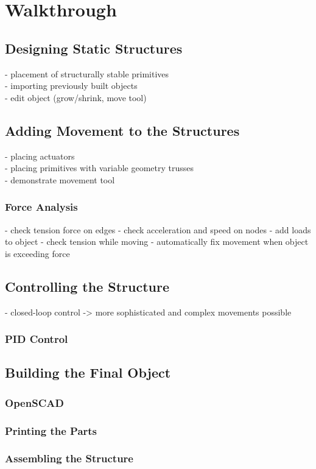 \chapter{Walkthrough}\label{ch:walkthrough}
\section{Designing Static Structures}
- placement of structurally stable primitives\\
- importing previously built objects\\
- edit object (grow/shrink, move tool)
\section{Adding Movement to the Structures}
- placing actuators\\
- placing primitives with variable geometry trusses\\
- demonstrate movement tool\\
\subsection{Force Analysis}
- check tension force on edges
- check acceleration and speed on nodes
- add loads to object
- check tension while moving
- automatically fix movement when object is exceeding force
\section{Controlling the Structure}
- closed-loop control -> more sophisticated and complex movements possible
\subsection{PID Control}
\section{Building the Final Object}
\subsection{OpenSCAD}
\subsection{Printing the Parts}
\subsection{Assembling the Structure}
